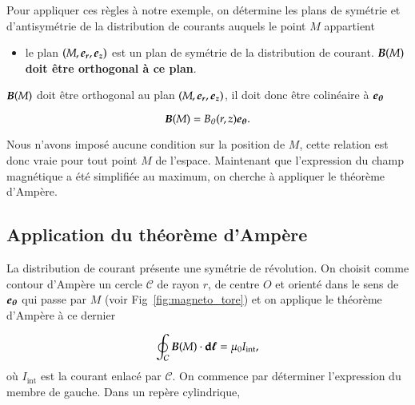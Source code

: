 Pour appliquer ces règles à notre exemple, on détermine les plans de symétrie 
et d'antisymétrie de la distribution de courants auquels 
le point $M$ appartient

\begin{itemize}
	\item le plan $(M, \er, \ez)$ est un plan de symétrie de la distribution
	  de courant. $\vecb(M)$ \textbf{doit être orthogonal à ce plan}.
\end{itemize}

$\vecb(M)$ doit être orthogonal au plan $(M, \er, \ez)$, 
il doit donc être colinéaire à $\etheta$

\begin{framed}
\begin{equation*}
	\vecb(M) = B_\theta(r, z) \etheta.
\end{equation*}
\end{framed}

Nous n'avons imposé aucune condition sur la position de $M$, cette relation est
donc vraie pour tout point $M$ de l'espace. Maintenant que l'expression du 
champ magnétique a été simplifiée au maximum, on cherche à appliquer le théorème
d'Ampère.

\subsection{Application du théorème d'Ampère}
La distribution de courant présente une symétrie de révolution. On choisit comme contour 
d'Ampère un cercle $\mathcal{C}$ de rayon $r$, de centre $O$ et orienté
dans le sens de $\etheta$ qui passe par $M$ 
(voir Fig~\ref{fig:magneto_tore}) et on applique le théorème d'Ampère à ce dernier

\begin{equation*}
	\oint_\mathcal{C} \vecb(M) \cdot \dl = \mu_0 I_\mathrm{int},
	\label{eq:cavite_gauss}
\end{equation*}
où $I_\mathrm{int}$ est la courant enlacé par $\mathcal{C}$. On commence
par déterminer l'expression du membre de gauche. Dans un repère cylindrique,

